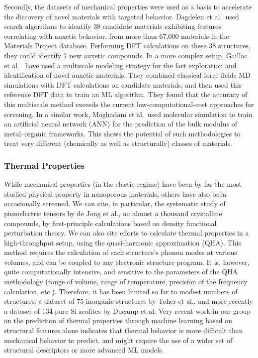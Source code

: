 \documentclass[main.tex]{subfiles}
\begin{document}
Secondly, the datasets of mechanical properties were used as a basis to accelerate the discovery of novel materials with targeted behavior. Dagdelen et al.\ used search algorithms to identify 38 candidate materials exhibiting features correlating with auxetic behavior, from more than 67,000 materials in the Materials Project database.\cite{Dagdelen_2017} Performing DFT calculations on these 38 structures, they could identify 7 new auxetic compounds. In a more complex setup, Gaillac et al.~\cite{Gaillac_2020} have used a multiscale modeling strategy for the fast exploration and identification of novel auxetic materials. They combined classical force fields MD simulations with DFT calculations on candidate materials, and then used this reference DFT data to train an ML algorithm. They found that the accuracy of this multiscale method exceeds the current low-computational-cost approaches for screening. In a similar work, Moghadam et al.\ used molecular simulation to train an artificial neural network (ANN) for the prediction of the bulk modulus of metal--organic frameworks.\cite{Moghadam_2019} This shows the potential of such methodologies to treat very different (chemically as well as structurally) classes of materials.

\subsubsection{Thermal Properties}

While mechanical properties (in the elastic regime) have been by far the most studied physical property in nanoporous materials, others have also been occasionally screened. We can cite, in particular, the systematic study of piezoelectric tensors by de Jong et al., on almost a thousand crystalline compounds, by first-principle calculations based on density functional perturbation theory.\cite{deJong2015_piezo} We can also cite efforts to calculate thermal properties in a high-throughput setup, using the quasi-harmonic approximation (QHA).\cite{Togo_2010} This method requires the calculation of each structure's phonon modes at various volumes, and can be coupled to any electronic structure program.\cite{Togo_2015} It is, however, quite computationally intensive, and sensitive to the parameters of the QHA methodology (range of volume, range of temperature, precision of the frequency calculation, etc.). Therefore, it has been limited so far to modest numbers of structures: a dataset of 75 inorganic structures by Toher et al.,\cite{Toher_2014} and more recently a dataset of 134 pure Si zeolites by Ducamp et al.\cite{Ducamp_2021} Very recent work in our group on the prediction of thermal properties through machine learning based on structural features alone indicates that thermal behavior is more difficult than mechanical behavior to predict, and might require the use of a wider set of structural descriptors or more advanced ML models.\cite{Ducamp_2022}
\end{document}
